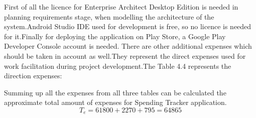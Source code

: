 First of all the licence for Enterprise Architect Desktop Edition is needed in planning requirements stage, when modelling the architecture of the system.Android Studio IDE used for development is free, so no licence is needed for it.Finally for deploying the application on Play Store, a Google Play Developer Console account is needed.
There are other additional expenses which should be taken in account as well.They represent the direct expenses used for work facilitation during project development.The Table 4.4 represents the direction expenses:
\begin{table}[H]
	\centering
	\caption{Direct expenses}
	\label{my-label}
\end{table}
Summing up all the expenses from all three tables can be calculated the approximate total amount of expenses for Spending Tracker application.
\begin{equation}
T_{e} = 61800 + 2270 + 795 = 64865
\end{equation}
